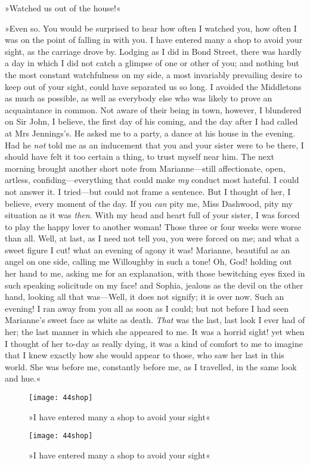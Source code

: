 »Watched us out of the house!«

»Even so. You would be surprised to hear how often I watched you, how often I was on the point of falling in with you. I have entered many a shop to avoid your sight, as the carriage drove by. Lodging as I did in Bond Street, there was hardly a day in which I did not catch a glimpse of one or other of you; and nothing but the most constant watchfulness on my side, a most invariably prevailing desire to keep out of your sight, could have separated us so long. I avoided the Middletons as much as possible, as well as everybody else who was likely to prove an acquaintance in common. Not aware of their being in town, however, I blundered on Sir John, I believe, the first day of his coming, and the day after I had called at Mrs Jennings’s. He asked me to a party, a dance at his house in the evening. Had he \textit{not} told me as an inducement that you and your sister were to be there, I should have felt it too certain a thing, to trust myself near him. The next morning brought another short note from Marianne—still affectionate, open, artless, confiding—everything that could make \textit{my} conduct most hateful. I could not answer it. I tried—but could not frame a sentence. But I thought of her, I believe, every moment of the day. If you \textit{can} pity me, Miss Dashwood, pity my situation as it was \textit{then}. With my head and heart full of your sister, I was forced to play the happy lover to another woman! Those three or four weeks were worse than all. Well, at last, as I need not tell you, you were forced on me; and what a sweet figure I cut! what an evening of agony it was! Marianne, beautiful as an angel on one side, calling me Willoughby in such a tone! Oh, God! holding out her hand to me, asking me for an explanation, with those bewitching eyes fixed in such speaking solicitude on my face! and Sophia, jealous as the devil on the other hand, looking all that was—Well, it does not signify; it is over now. Such an evening! I ran away from you all as soon as I could; but not before I had seen Marianne’s sweet face as white as death. \textit{That} was the last, last look I ever had of her; the last manner in which she appeared to me. It was a horrid sight! yet when I thought of her to-day as really dying, it was a kind of comfort to me to imagine that I knew exactly how she would appear to those, who saw her last in this world. She was before me, constantly before me, as I travelled, in the same look and hue.«


\makeatletter
{}
{%
\begin{figure}[tbph]
\centering
\texttt{[image: 44shop]}
\caption{»I have entered many a shop to avoid your sight«}
\end{figure}

}{%
\begin{figure}[tbph]
\centering
\texttt{[image: 44shop]}
\caption{»I have entered many a shop to avoid your sight«}
\end{figure}

}
\makeatother

